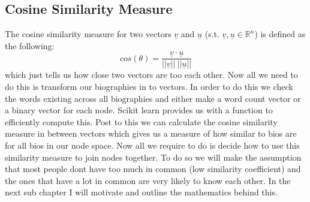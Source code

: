 \documentclass[10pt,twocolumn]{article}
\begin{document}
\subsection{Cosine Similarity Measure}
The cosine similarity measure for two vectors $\underline{v} $ and $\underline{u}$ (s.t. $\underline{v}, \underline{u} \in \mathbb{R}^{n}$) is defined as the following:
\[
cos(\theta) = \frac{\underline{v}\cdot \underline{u}}{||\underline{v}|| \: ||\underline{u}||}
\]
which just tells us how close two vectors are too each other. Now all we need to do this is transform our biographies in to vectors. In order to do this we check the words existing across all biographies and either make a word count vector or a binary vector for each node. Scikit learn provides us with a function to efficiently compute this. 
\newline\newline
Post to this
we can calculate the cosine similarity measure in between vectors which gives us a measure of how similar to bios are for all bios in our node space.
\newline\newline 
Now all we require to do is decide how to use this similarity measure to join nodes together. To do so we will make the assumption that most people dont have too much in common (low similarity coefficient) and the ones that have a lot in common are very likely to know each other. In the next sub chapter I will motivate and outline the mathematics behind this.
\end{document}
